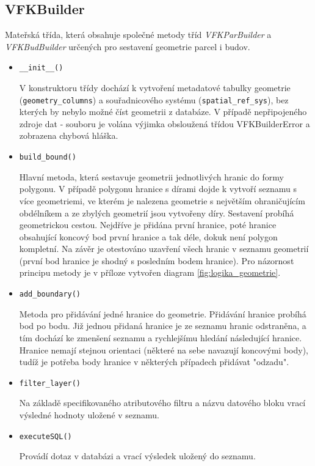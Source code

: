 \subsection{VFKBuilder}
\label{subsec:sestaveni_geometrie}
Mateřská třída, která obsahuje společné metody tříd
\textit{VFKParBuilder} a \textit{VFKBudBuilder} určených pro sestavení
geometrie parcel i budov.
\begin{itemize}[leftmargin=50pt]
\item \verb|__init__()|

  V konstruktoru třídy dochází k vytvoření metadatové tabulky geometrie 
  (\verb|geometry_columns|) a souřadnicového systému
  (\verb|spatial_ref_sys|), bez kterých by nebylo možné číst geometrii
  z databáze. V případě nepřipojeného zdroje dat -  souboru je
volána výjimka obsloužená třídou VFKBuilderError a zobrazena chybová hláška.
\item \verb|build_bound()|

Hlavní metoda, která sestavuje geometrii jednotlivých hranic do formy polygonu. V
případě polygonu hranice s dírami dojde k vytvoří seznamu s více geometriemi,
ve kterém je nalezena geometrie s největším ohraničujícím obdélníkem a
ze zbylých geometrií jsou vytvořeny díry. Sestavení probíhá
geometrickou cestou. Nejdříve je přidána první hranice, poté hranice
obsahující koncový bod první hranice a tak
déle, dokuk není polygon kompletní. Na závěr je otestováno uzavření všech hranic v seznamu
geometrií (první bod hranice je shodný s posledním bodem hranice). Pro
názornost principu metody je v příloze vytvořen
diagram \ref{fig:logika_geometrie}.
\item \verb|add_boundary()|

Metoda pro přidávání jedné hranice do geometrie. Přidávání hranice
probíhá bod po bodu. Již jednou přidaná hranice je ze seznamu hranic odstraněna,
a tím dochází ke zmenšení seznamu a rychlejšímu hledání následující hranice. Hranice nemají stejnou
orientaci (některé na sebe navazují koncovými body), tudíž je potřeba
body hranice v některých případech přidávat "odzadu".
\item \verb|filter_layer()|

Na základě specifikovaného atributového filtru a názvu datového bloku
vrací výsledné hodnoty uložené v seznamu.
\item \verb|executeSQL()|

Provádí  dotaz v databázi a vrací výsledek uložený do seznamu.

\end{itemize}
